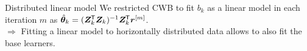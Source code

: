 \documentclass[t,10pt]{beamer}
\newcommand{\penMat}{\bm{K}}
\begin{document}
\begin{frame}{Distributed linear model}
  We restricted CWB to fit $b_k$ as a linear model in each iteration $m$ as $\hat{\bm{\theta}}_k = (\bm{Z}_k^{\mkern-1.5mu\mathsf{T}} \bm{Z}_k)^{-1}\bm{Z}_k^{\mkern-1.5mu\mathsf{T}} \bm{r}^{[m]}$.\\[0.5cm]

  $\Rightarrow$ Fitting a linear model to horizontally distributed data allows to also fit the base learners.

\end{frame}
\end{document}
